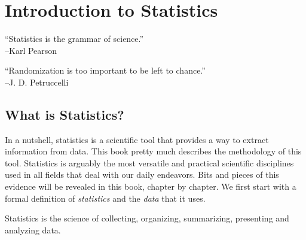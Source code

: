 \chapter{Introduction to Statistics} 

\begin{flushleft} 
   {\hfill ``Statistics is the grammar of science.''\\}
   {\hfill --Karl Pearson\\}
\end{flushleft} 

\begin{flushleft} 
   {\hfill ``Randomization is too important to be left to chance.''\\}
   {\hfill --J. D. Petruccelli\\}
\end{flushleft}
\vspace{0.25in} 




\section{What is Statistics?}
In a nutshell, statistics is a scientific tool that provides a way to extract information from data. This book pretty much describes the methodology of this tool. Statistics is arguably the most versatile and practical scientific disciplines used in all fields that deal with our daily endeavors. Bits and pieces of this evidence will be revealed in this book, chapter by chapter. We first start with a formal definition of {\it{statistics}} and the {\it{data}} that it uses.   

\begin{definition}[Statistics] \label{stat-def-001} 
Statistics is the science of collecting, organizing, summarizing, presenting and analyzing data. 
\end{definition} 

%

